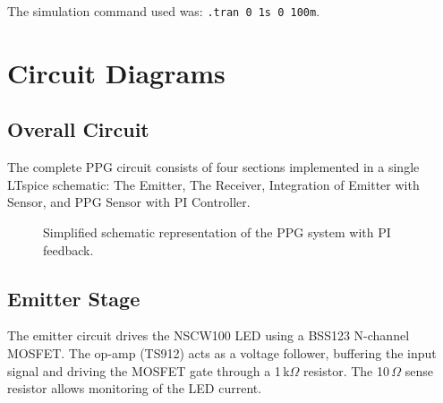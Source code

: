\documentclass[10pt]{article}
\begin{document}
The simulation command used was: \texttt{.tran 0 1s 0 100m}.


\section{Circuit Diagrams}

\subsection{Overall Circuit}

The complete PPG circuit consists of four sections implemented in a single LTspice schematic: The Emitter, The Receiver, Integration of Emitter with Sensor, and PPG Sensor with PI Controller.

\begin{figure}[H]
\centering
{}
\caption{Simplified schematic representation of the PPG system with PI feedback.}
\end{figure}

\subsection{Emitter Stage}

The emitter circuit drives the NSCW100 LED using a BSS123 N-channel MOSFET. The op-amp (TS912) acts as a voltage follower, buffering the input signal and driving the MOSFET gate through a 1\,k$\Omega$ resistor. The 10\,$\Omega$ sense resistor allows monitoring of the LED current.
\end{document}
